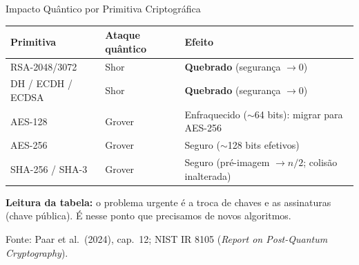 \documentclass{beamer}
\begin{document}
\begin{frame}{Impacto Quântico por Primitiva Criptográfica}
    \begin{center}
    \renewcommand{\arraystretch}{1.3}
    \footnotesize
    \begin{tabularx}{\linewidth}{@{}l l >{\raggedright\arraybackslash}X@{}}
        \toprule
        \textbf{Primitiva} & \textbf{Ataque quântico} & \textbf{Efeito} \\
        \midrule
        \rowcolor{red!8} RSA-2048/3072 & Shor & \textbf{Quebrado} (segurança $\to 0$) \\
        \rowcolor{red!8} DH / ECDH / ECDSA & Shor & \textbf{Quebrado} (segurança $\to 0$) \\
        \midrule
        \rowcolor{green!8} AES-128 & Grover & Enfraquecido ($\sim$64 bits): migrar para AES-256 \\
        \rowcolor{green!8} AES-256 & Grover & Seguro ($\sim$128 bits efetivos) \\
        \rowcolor{green!8} SHA-256 / SHA-3 & Grover & Seguro (pré-imagem $\to n/2$; colisão inalterada) \\
        \bottomrule
    \end{tabularx}
    \end{center}
    \medskip
    \begin{tcolorbox}[colback=blue!5,colframe=blue!50!black,boxrule=0.5pt]
        \footnotesize
        \textbf{Leitura da tabela:} o problema urgente é a troca de chaves e as assinaturas (chave pública). É nesse ponto que precisamos de novos algoritmos.
    \end{tcolorbox}
    \smallskip
    {\tiny Fonte: Paar et al.\ (2024), cap.\ 12; NIST IR 8105 (\textit{Report on Post-Quantum Cryptography}).}
\end{frame}
\end{document}
